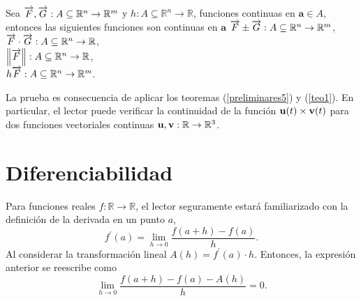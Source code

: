 \begin{teorema}
  Sea $\overrightarrow{F},\overrightarrow{G}:A\subseteq \mathbb{R}^n\to \mathbb{R}^m$ y $h:A\subseteq \mathbb{R}^n\to \mathbb{R}$,
  funciones continuas en $\mathbf{a}\in A$, entonces las siguientes funciones son continuas en $\mathbf{a}$
  $\overrightarrow{F}\pm \overrightarrow{G}:A\subseteq \mathbb{R}^n\to \mathbb{R}^m$, \\
  $ \overrightarrow{F}\cdot \overrightarrow{G}:A\subseteq \mathbb{R}^n\to \mathbb{R}$,\\
  $\left\Vert  \overrightarrow{F}\right\Vert :A\subseteq \mathbb{R}^n\to \mathbb{R}$,\\
  $h\overrightarrow{F}:A\subseteq \mathbb{R}^n\to \mathbb{R}^m$.
\end{teorema}
La prueba es consecuencia de aplicar los teoremas (\ref{preliminares5}) y (\ref{teo1}).
En particular, el lector puede verificar la continuidad de la función ${\bf u}(t) \times {\bf v}(t)$ para dos funciones vectoriales continuas
${\bf u}, {\bf v}: \mathbb{R}\to \mathbb{R}^3$.

\section{Diferenciabilidad} \label{diferencibilidad}
Para funciones reales $f:\mathbb{R}\rightarrow \mathbb{R}$, el lector seguramente
estará familiarizado con la definición de la derivada en un punto $a$,
$$f^{\prime}(a) =\lim_{h\rightarrow 0}\frac{f(a+h)-f(a) }{h}.$$
Al considerar la transformación lineal $A(h)=f^{\prime}(a)\cdot h$.
Entonces, la expresión anterior se reescribe como
$$\lim_{h\rightarrow 0}\frac{f\left( a+h\right) -f\left( a\right) -A\left( h\right) }{h}=0.$$


